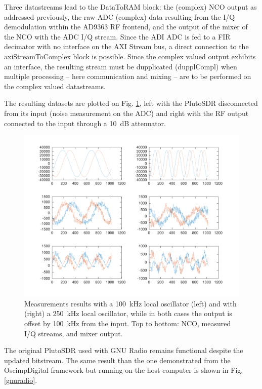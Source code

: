 \documentclass[12pt,oneside]{article}
\begin{document}
Three datastreams lead to the DataToRAM block: the (complex) NCO output as addressed 
previously, the raw ADC (complex) data resulting from the I/Q demodulation within 
the AD9363 RF frontend, and the output of the mixer of the NCO with the ADC I/Q stream.
Since the ADI ADC is fed to a FIR decimator with no interface on the AXI Stream bus,
a direct connection to the axiStreamToComplex block is possible. Since the complex
valued output exhibits an interface, the resulting stream must be dupplicated 
(dupplCompl) when multiple processing -- here communication and mixing -- are to be
performed on the complex valued datastreams.

The resulting datasets are plotted on Fig. \ref{openclosed}, left with the
PlutoSDR disconnected from its input (noise measurement on the ADC) and right with
the RF output connected to the input through a 10~dB attenuator.

\begin{figure}[h!tb]
\includegraphics[width=\linewidth]{100kHz_250kHz}
\caption{Measurements results with a 100~kHz local oscillator (left) and with (right) a
250~kHz local oscillator, while in both cases the output is offset by 100~kHz from the
input. Top to bottom: NCO, measured I/Q streams, and mixer output.}
\label{openclosed}
\end{figure}

The original PlutoSDR used with GNU Radio remains functional despite the updated bitstream.
The same result than the one demonstrated from the OscimpDigital framework but running on the
host computer is shown in Fig. \ref{gnuradio}.
\end{document}
